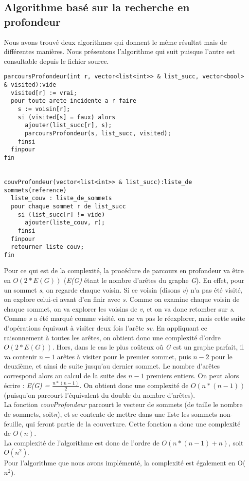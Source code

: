 \subsection{Algorithme bas\'e sur la recherche en profondeur}

Nous avons trouv\'e deux algorithmes qui donnent le m\^eme r\'esultat
mais de diff\'erentes mani\`eres. Nous pr\'esentons l'algorithme qui suit
puisque l'autre est consultable depuis le fichier source.

\begin{verbatim}
parcoursProfondeur(int r, vector<list<int>> & list_succ, vector<bool> & visited):vide
  visited[r] := vrai;
  pour toute arete incidente a r faire
    s := voisin[r];
    si (visited[s] = faux) alors
      ajouter(list_succ[r], s);
      parcoursProfondeur(s, list_succ, visited);
    finsi
  finpour
fin


couvProfondeur(vector<list<int>> & list_succ):liste_de sommets(reference)
  liste_couv : liste_de_sommets
  pour chaque sommet r de list_succ
    si (list_succ[r] != vide)
      ajouter(liste_couv, r);
    finsi
  finpour
  retourner liste_couv;
fin
\end{verbatim}

Pour ce qui est de la complexit\'e, la proc\'edure de parcours en profondeur va \^etre en \textit{$O(2*E(G))$} (\textit{E(G)} \'etant le nombre
d'ar\^etes du graphe \textit{G}). En effet, pour un sommet \textit{s}, on regarde chaque voisin. Si ce voisin (disons \textit{v}) n'a pas \'et\'e
visit\'e, on explore celui-ci avant d'en finir avec \textit{s}. Comme on examine chaque voisin de chaque sommet, on va explorer les
voisins de \textit{v}, et on va donc retomber sur \textit{s}. Comme \textit{s} a \'et\'e marqu\'e comme visit\'e, on ne va pas le r\'eexplorer,
mais cette suite d'op\'erations \'equivaut \`a visiter deux fois l'ar\^ete \textit{sv}. En appliquant ce raisonnement \`a toutes les ar\^etes,
on obtient donc une complexit\'e d'ordre \textit{$O(2*E(G))$}. Hors, dans le cas le plus co\^uteux o\^u \textit{G} est un graphe parfait,
il va contenir \textit{$n-1$} ar\^etes \`a visiter pour le premier sommet, puis \textit{$n-2$} pour le deuxi\`eme, et ainsi de suite jusqu'au
dernier sommet. Le nombre d'ar\^etes correspond alors au calcul de la suite des \textit{$n-1$} premiers entiers. On peut alors \'ecrire :
\textit{ E(G) = $\frac{n*(n-1)}{2} $}. On obtient donc une complexit\'e de \textit{$O(n*(n-1))$} (puisqu'on parcourt l'\'equivalent du double
du nombre d'ar\^etes).\\

La fonction \textit{couvProfondeur} parcourt le vecteur de sommets (de taille le nombre de sommets, soit\textit{n}), et se contente de mettre
dans une liste les sommets non-feuille, qui feront partie de la couverture. Cette fonction a donc une complexit\'e de \textit{$O(n)$}.\\

La complexit\'e de l'algorithme est donc de l'ordre de \textit{$O( n*(n-1) + n )$}, soit \textit{$O(n^2)$}.\\

Pour l'algorithme que nous avons impl\'ement\'e, la complexit\'e est
\'egalement en O($n^{2}$).